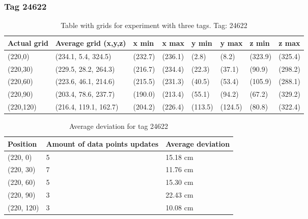 \subsubsection{Tag 24622}
\begin{table}[H] 
    \centering
    \begin{tabular}{|l|l|l|l|l|l|l|l|}
        \hline
        Actual grid & Average grid (x,y,z)       & x min          & x max    & y min    & y max   & z min   & z max    \\ \hline
        (220,0) 	& (234.1, 5.4, 324.5) 	 & (232.7) 	& (236.1)	& (2.8)	 & (8.2) 	 & (323.9)	 & (325.4)	\\ \hline
        (220,30) 	& (229.5, 28.2, 264.3) 	 & (216.7) 	& (234.4)	& (22.3)	 & (37.1) 	 & (90.9)	 & (298.2)	\\ \hline
        (220,60) 	& (223.6, 46.1, 214.6) 	 & (215.5) 	& (231.3)	& (40.5)	 & (53.4) 	 & (105.9)	 & (288.1)	\\ \hline
        (220,90) 	& (203.4, 78.6, 237.7) 	 & (190.0) 	& (213.4)	& (55.1)	 & (94.2) 	 & (67.2)	 & (329.2)	\\ \hline
        (220,120) 	& (216.4, 119.1, 162.7) 	 & (204.2) 	& (226.4)	& (113.5)	 & (124.5) 	 & (80.8)	 & (322.4)	\\ \hline
        \end{tabular}
    \caption{Table with grids for experiment with three tags. Tag: 24622}
    \label{Tab:three-tag-experiment-result-tag-24622}
\end{table}

\begin{table}[H]
    \centering
    \begin{tabular}{|l|l|l|}
    \hline
    Position   & Amount of data points updates  & Average deviation   \\ \hline
    (220, 0)   & 5                              & 15.18 cm                     \\ \hline
    (220, 30)  & 7                              & 11.76 cm                     \\ \hline
    (220, 60)  & 5                              & 15.30 cm                     \\ \hline
    (220, 90)  & 3                              & 22.43 cm                     \\ \hline
    (220, 120) & 3                              & 10.08 cm                     \\ \hline
    \end{tabular}
\caption{Average deviation for tag 24622}
\end{table}






